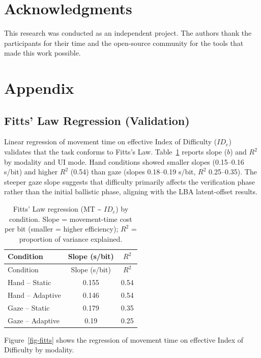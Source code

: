 \documentclass[
  11pt,
  11pt,
  letterpaper]{article}
\begin{document}
\section{Acknowledgments}\label{acknowledgments}

This research was conducted as an independent project. The authors thank
the participants for their time and the open-source community for the
tools that made this work possible.

\section{Appendix}\label{appendix}

\subsection{Fitts' Law Regression
(Validation)}\label{fitts-law-regression-validation}

Linear regression of movement time on effective Index of Difficulty
(\(ID_e\)) validates that the task conforms to Fitts's Law.
Table~\ref{tbl-fitts} reports slope (\(b\)) and \(R^2\) by modality and
UI mode. Hand conditions showed smaller slopes (0.15--0.16 s/bit) and
higher \(R^2\) (0.54) than gaze (slopes 0.18--0.19 s/bit, \(R^2\)
0.25--0.35). The steeper gaze slope suggests that difficulty primarily
affects the verification phase rather than the initial ballistic phase,
aligning with the LBA latent-offset results.

\begin{longtable}[]{@{}lcc@{}}
\caption{Fitts' Law regression (MT \textasciitilde{} \(ID_e\)) by
condition. Slope = movement-time cost per bit (smaller = higher
efficiency); \(R^2\) = proportion of variance
explained.}\label{tbl-fitts}\tabularnewline
\toprule\noalign{}
Condition & Slope (s/bit) & \(R^2\) \\
\midrule\noalign{}
\endfirsthead
\toprule\noalign{}
Condition & Slope (s/bit) & \(R^2\) \\
\midrule\noalign{}
\endhead
\bottomrule\noalign{}
\endlastfoot
Hand -- Static & 0.155 & 0.54 \\
Hand -- Adaptive & 0.146 & 0.54 \\
Gaze -- Static & 0.179 & 0.35 \\
Gaze -- Adaptive & 0.19 & 0.25 \\
\end{longtable}

Figure~\ref{fig-fitts} shows the regression of movement time on
effective Index of Difficulty by modality.
\end{document}
